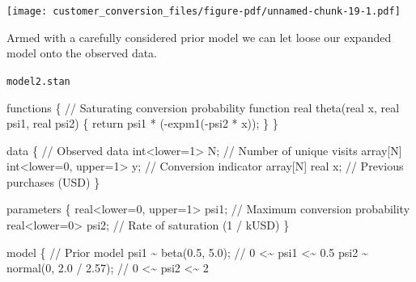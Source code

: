 \documentclass[
  letterpaper,
  DIV=11,
  numbers=noendperiod]{scrartcl}
\newenvironment{Shaded}{\begin{snugshade}}{\end{snugshade}}
\newcommand{\CommentTok}[1]{\textcolor[rgb]{0.37,0.37,0.37}{#1}}
\newcommand{\ControlFlowTok}[1]{\textcolor[rgb]{0.00,0.23,0.31}{#1}}
\newcommand{\DataTypeTok}[1]{\textcolor[rgb]{0.68,0.00,0.00}{#1}}
\newcommand{\DecValTok}[1]{\textcolor[rgb]{0.68,0.00,0.00}{#1}}
\newcommand{\FloatTok}[1]{\textcolor[rgb]{0.68,0.00,0.00}{#1}}
\newcommand{\KeywordTok}[1]{\textcolor[rgb]{0.00,0.23,0.31}{#1}}
\newcommand{\NormalTok}[1]{\textcolor[rgb]{0.00,0.23,0.31}{#1}}
\begin{document}
\texttt{[image: customer\_conversion\_files/figure-pdf/unnamed-chunk-19-1.pdf]}

Armed with a carefully considered prior model we can let loose our
expanded model onto the observed data.

\begin{codelisting}

\caption{\texttt{model2.stan}}

\begin{Shaded}
\begin{Highlighting}[]
\KeywordTok{functions}\NormalTok{ \{}
  \CommentTok{// Saturating conversion probability function}
  \DataTypeTok{real}\NormalTok{ theta(}\DataTypeTok{real}\NormalTok{ x, }\DataTypeTok{real}\NormalTok{ psi1, }\DataTypeTok{real}\NormalTok{ psi2) \{}
    \ControlFlowTok{return}\NormalTok{ psi1 * ({-}expm1({-}psi2 * x));}
\NormalTok{  \}}
\NormalTok{\}}

\KeywordTok{data}\NormalTok{ \{}
  \CommentTok{// Observed data}
  \DataTypeTok{int}\NormalTok{\textless{}}\KeywordTok{lower}\NormalTok{=}\DecValTok{1}\NormalTok{\textgreater{} N;                    }\CommentTok{// Number of unique visits}
  \DataTypeTok{array}\NormalTok{[N] }\DataTypeTok{int}\NormalTok{\textless{}}\KeywordTok{lower}\NormalTok{=}\DecValTok{0}\NormalTok{, }\KeywordTok{upper}\NormalTok{=}\DecValTok{1}\NormalTok{\textgreater{} y;  }\CommentTok{// Conversion indicator}
  \DataTypeTok{array}\NormalTok{[N] }\DataTypeTok{real}\NormalTok{ x;                   }\CommentTok{// Previous purchases (USD)}
\NormalTok{\}}

\KeywordTok{parameters}\NormalTok{ \{}
  \DataTypeTok{real}\NormalTok{\textless{}}\KeywordTok{lower}\NormalTok{=}\DecValTok{0}\NormalTok{, }\KeywordTok{upper}\NormalTok{=}\DecValTok{1}\NormalTok{\textgreater{} psi1; }\CommentTok{// Maximum conversion probability}
  \DataTypeTok{real}\NormalTok{\textless{}}\KeywordTok{lower}\NormalTok{=}\DecValTok{0}\NormalTok{\textgreater{} psi2;          }\CommentTok{// Rate of saturation (1 / kUSD)}
\NormalTok{\}}

\KeywordTok{model}\NormalTok{ \{}
  \CommentTok{// Prior model}
\NormalTok{  psi1 \textasciitilde{} beta(}\FloatTok{0.5}\NormalTok{, }\FloatTok{5.0}\NormalTok{);        }\CommentTok{// 0 \textless{}\textasciitilde{} psi1 \textless{}\textasciitilde{} 0.5}
\NormalTok{  psi2 \textasciitilde{} normal(}\DecValTok{0}\NormalTok{, }\FloatTok{2.0}\NormalTok{ / }\FloatTok{2.57}\NormalTok{); }\CommentTok{// 0 \textless{}\textasciitilde{} psi2 \textless{}\textasciitilde{} 2}


\end{Highlighting}
\end{Shaded}
\end{codelisting}
\end{document}
